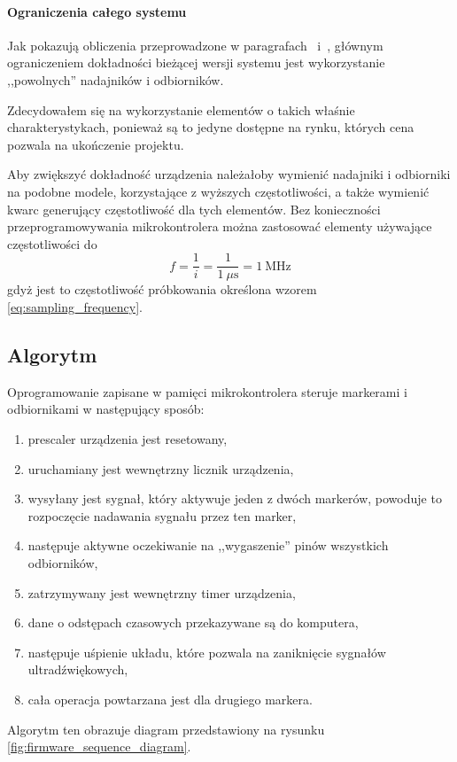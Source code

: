 \paragraph{Ograniczenia całego systemu}
Jak pokazują obliczenia przeprowadzone w paragrafach~ i~, głównym ograniczeniem dokładności bieżącej wersji systemu jest wykorzystanie ,,powolnych'' nadajników i odbiorników.

Zdecydowałem się na wykorzystanie elementów  o takich właśnie charakterystykach, ponieważ są to jedyne dostępne na rynku, których cena pozwala na ukończenie projektu.

Aby zwiększyć dokładność urządzenia należałoby wymienić nadajniki i odbiorniki na podobne modele, korzystające z wyższych częstotliwości, a także wymienić kwarc generujący częstotliwość dla tych elementów. Bez konieczności przeprogramowywania mikrokontrolera można zastosować elementy używające częstotliwości do
\begin{equation}
 f = \frac{1}{i} = \frac{1}{1~\mu\textrm{s}} = 1~\textrm{MHz}
\end{equation}
gdyż jest to częstotliwość próbkowania określona wzorem \ref{eq:sampling_frequency}.

\subsection{Algorytm}
Oprogramowanie zapisane w pamięci mikrokontrolera steruje markerami i odbiornikami w następujący sposób:
\begin{enumerate}
 \item {}prescaler urządzenia jest resetowany,\label{enum:prescaler}
 \item uruchamiany jest wewnętrzny licznik urządzenia,
 \item wysyłany jest sygnał, który aktywuje jeden z dwóch markerów, powoduje to rozpoczęcie nadawania sygnału przez ten marker,
 \item następuje aktywne oczekiwanie na ,,wygaszenie'' pinów wszystkich odbiorników,
 \item zatrzymywany jest wewnętrzny timer urządzenia,
 \item dane o odstępach czasowych przekazywane są do komputera,
 \item następuje uśpienie układu, które pozwala na zaniknięcie sygnałów ultradźwiękowych,
 \item cała operacja powtarzana jest dla drugiego markera.
\end{enumerate}
Algorytm ten obrazuje diagram przedstawiony na rysunku \ref{fig:firmware_sequence_diagram}.

